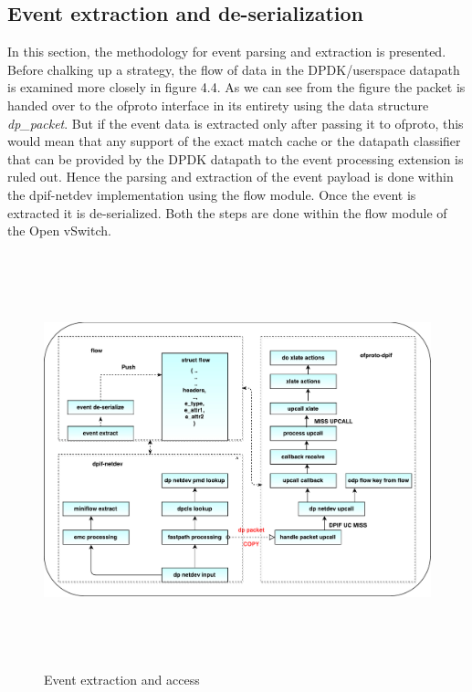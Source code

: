 \subsection{Event extraction and de-serialization}
In this section, the methodology for event parsing and extraction is presented. Before chalking up a strategy, the flow of data in the DPDK/userspace datapath is examined more closely in figure 4.4. As we can see from the figure the packet is handed over to the ofproto interface in its entirety using the data structure \textit{dp_packet}. But if the event data is extracted only after passing it to ofproto, this would mean that any support of the exact match cache or the datapath classifier that can be provided by the DPDK datapath to the event processing extension is ruled out. Hence the parsing and extraction of the event payload is done within the dpif-netdev implementation using the flow module. Once the event is extracted it is de-serialized. Both the steps are done within the flow module of the Open vSwitch. 

\begin{figure}[H]
	\centering
	\caption{Event extraction and access}
	\includegraphics[height=12cm]{flowextract01.pdf}
\end{figure}

